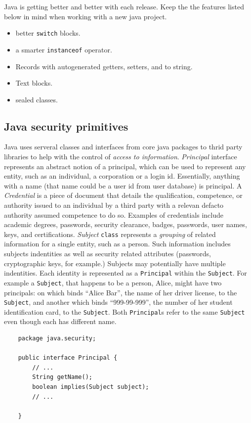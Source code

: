 \documentclass[a4paper]{article}
\begin{document}
Java is getting better and better with each release. Keep the the features listed below in mind when working with a new
java project.
\begin{itemize}
    \item better \lstinline{switch} blocks.
    \item a smarter \lstinline{instanceof} operator.
    \item Records with autogenerated getters, setters, and to string.
    \item Text blocks.
    \item sealed classes.
\end{itemize}

\subsection*{Java security primitives}
Java uses serveral classes and interfaces from core java packages to thrid party libraries to help with the control of \emph{access to information}.
\emph{Principal} interface represents an abstract notion of a principal, which can be used to represent any entity, 
such as an individual, a corporation or a login id. Essentially, anything with a name (that name could be a user id from user database) 
is principal. 
A \emph{Credential} is a piece of document that details the qualification, competence, or authority issued to an individual by a third party
with a relevan defacto authority assumed competence to do so. Examples of credentials include academic degrees, passwords,
security clearance, badges, passwords, user names, keys, and certifications. \emph{Subject} \lstinline{class} represents 
a \emph{grouping} of related information for a single entity, such as a person. Such information includes subjects indentities
as well as security related attributes (passwords, cryptographic keys, for example.) Subjects may potentially have multiple
indentities. Each identity is represented as a \lstinline{Principal} within the \lstinline{Subject}. For example a \lstinline{Subject},
that happens to be a person, Alice, might have two principals: on which binds ``Alice Bar'', the name of her driver license,
to the \lstinline{Subject}, and another which binds ``999-99-999'', the number of her student identification card, to the 
\lstinline{Subject}. Both \lstinline{Principal}s refer to the same \lstinline{Subject} even though each has different name. 


\lstset{style=custom-java}
\begin{lstlisting}
    package java.security;

    public interface Principal {
        // ...
        String getName();
        boolean implies(Subject subject);
        // ...

    }
\end{lstlisting}
\end{document}
